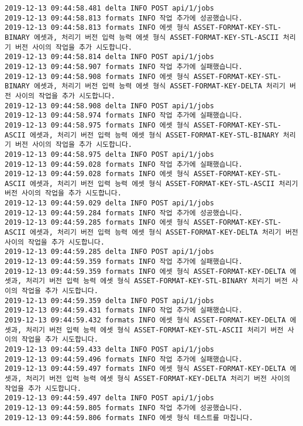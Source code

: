 \begin{Verbatim}[fontsize=\tiny, breaklines=true, breakanywhere=true]
2019-12-13 09:44:58.481 delta INFO POST api/1/jobs
2019-12-13 09:44:58.813 formats INFO 작업 추가에 성공했습니다.
2019-12-13 09:44:58.813 formats INFO 에셋 형식 ASSET-FORMAT-KEY-STL-BINARY 에셋과, 처리기 버전 입력 능력 에셋 형식 ASSET-FORMAT-KEY-STL-ASCII 처리기 버전 사이의 작업을 추가 시도합니다.
2019-12-13 09:44:58.814 delta INFO POST api/1/jobs
2019-12-13 09:44:58.907 formats INFO 작업 추가에 실패했습니다.
2019-12-13 09:44:58.908 formats INFO 에셋 형식 ASSET-FORMAT-KEY-STL-BINARY 에셋과, 처리기 버전 입력 능력 에셋 형식 ASSET-FORMAT-KEY-DELTA 처리기 버전 사이의 작업을 추가 시도합니다.
2019-12-13 09:44:58.908 delta INFO POST api/1/jobs
2019-12-13 09:44:58.974 formats INFO 작업 추가에 실패했습니다.
2019-12-13 09:44:58.975 formats INFO 에셋 형식 ASSET-FORMAT-KEY-STL-ASCII 에셋과, 처리기 버전 입력 능력 에셋 형식 ASSET-FORMAT-KEY-STL-BINARY 처리기 버전 사이의 작업을 추가 시도합니다.
2019-12-13 09:44:58.975 delta INFO POST api/1/jobs
2019-12-13 09:44:59.028 formats INFO 작업 추가에 실패했습니다.
2019-12-13 09:44:59.028 formats INFO 에셋 형식 ASSET-FORMAT-KEY-STL-ASCII 에셋과, 처리기 버전 입력 능력 에셋 형식 ASSET-FORMAT-KEY-STL-ASCII 처리기 버전 사이의 작업을 추가 시도합니다.
2019-12-13 09:44:59.029 delta INFO POST api/1/jobs
2019-12-13 09:44:59.284 formats INFO 작업 추가에 성공했습니다.
2019-12-13 09:44:59.285 formats INFO 에셋 형식 ASSET-FORMAT-KEY-STL-ASCII 에셋과, 처리기 버전 입력 능력 에셋 형식 ASSET-FORMAT-KEY-DELTA 처리기 버전 사이의 작업을 추가 시도합니다.
2019-12-13 09:44:59.285 delta INFO POST api/1/jobs
2019-12-13 09:44:59.359 formats INFO 작업 추가에 실패했습니다.
2019-12-13 09:44:59.359 formats INFO 에셋 형식 ASSET-FORMAT-KEY-DELTA 에셋과, 처리기 버전 입력 능력 에셋 형식 ASSET-FORMAT-KEY-STL-BINARY 처리기 버전 사이의 작업을 추가 시도합니다.
2019-12-13 09:44:59.359 delta INFO POST api/1/jobs
2019-12-13 09:44:59.431 formats INFO 작업 추가에 실패했습니다.
2019-12-13 09:44:59.432 formats INFO 에셋 형식 ASSET-FORMAT-KEY-DELTA 에셋과, 처리기 버전 입력 능력 에셋 형식 ASSET-FORMAT-KEY-STL-ASCII 처리기 버전 사이의 작업을 추가 시도합니다.
2019-12-13 09:44:59.433 delta INFO POST api/1/jobs
2019-12-13 09:44:59.496 formats INFO 작업 추가에 실패했습니다.
2019-12-13 09:44:59.497 formats INFO 에셋 형식 ASSET-FORMAT-KEY-DELTA 에셋과, 처리기 버전 입력 능력 에셋 형식 ASSET-FORMAT-KEY-DELTA 처리기 버전 사이의 작업을 추가 시도합니다.
2019-12-13 09:44:59.497 delta INFO POST api/1/jobs
2019-12-13 09:44:59.805 formats INFO 작업 추가에 성공했습니다.
2019-12-13 09:44:59.806 formats INFO 에셋 형식 테스트를 마칩니다.    
\end{Verbatim}

